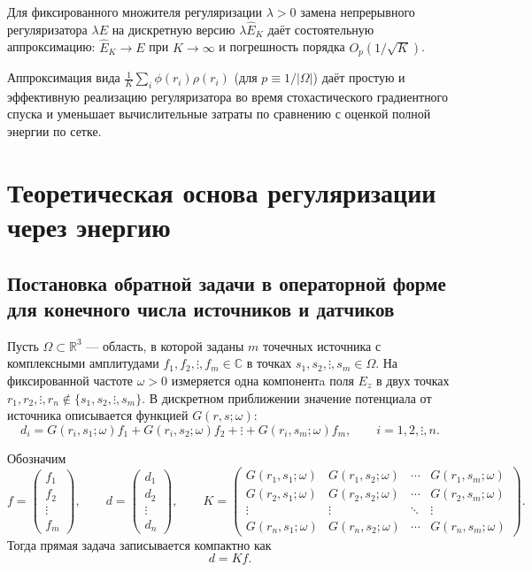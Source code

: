 \documentclass[a4paper,14pt,oneside,openany]{extarticle}
\begin{document}
Для фиксированного множителя регуляризации $\lambda>0$ замена непрерывного регуляризатора $\lambda E$ на дискретную версию $\lambda\hat E_K$ даёт состоятельную аппроксимацию: $\hat E_K\to E$ при $K\to\infty$ и погрешность порядка $O_p(1/\sqrt{K})$.


\begin{remark}
Аппроксимация вида $\frac{1}{K}\sum_i\phi(r_i)\rho(r_i)$ (для $p\equiv 1/|\Omega|$) даёт простую и эффективную реализацию регуляризатора во время стохастического градиентного спуска и уменьшает вычислительные затраты по сравнению с оценкой полной энергии по сетке.
\end{remark}

\newpage
\section{Теоретическая основа регуляризации через энергию}
\subsection{Постановка обратной задачи в операторной форме для конечного числа источников и датчиков}

Пусть $\Omega\subset\mathbb{R}^3$ — область, в которой заданы $m$ точечных источника с 
комплексными амплитудами $f_1,f_2, \vdots, f_m\in\mathbb{C}$ в точках $s_1,s_2, \vdots, s_m\in\Omega$. На фиксированной частоте
$\omega>0$ измеряется одна компонентa поля $E_z$ в двух точках $r_1,r_2, \vdots, r_n \notin\{s_1,s_2, \vdots, s_m\}$.
В дискретном приближении значение потенциала от источника описывается функцией $G(r,s;\omega)$:
\begin{equation}\label{eq:direct_em}
    d_i = G(r_i,s_1;\omega) f_1 + G(r_i,s_2;\omega) f_2 + \vdots + G(r_i,s_m;\omega) f_m,
    \qquad i=1,2, \vdots, n.
\end{equation}

Обозначим
\begin{equation}
    f=\begin{pmatrix}f_1\\ f_2 \\ \vdots \\ f_m\end{pmatrix},
    \qquad
    d=\begin{pmatrix}d_1\\ d_2 \\ \vdots \\ d_n\end{pmatrix},
    \qquad
    K=\begin{pmatrix}
        G(r_1,s_1;\omega) & G(r_1,s_2;\omega) & \cdots & G(r_1,s_m;\omega)\\
        G(r_2,s_1;\omega) & G(r_2,s_2;\omega) & \cdots & G(r_2,s_m;\omega)\\
        \vdots & \vdots & \ddots & \vdots\\
        G(r_n,s_1;\omega) & G(r_n,s_2;\omega) & \cdots & G(r_n,s_m;\omega)
    \end{pmatrix}.
\end{equation}
Тогда прямая задача записывается компактно как
\begin{equation}\label{eq:direct_matrix}
    d=Kf.
\end{equation}
\end{document}
